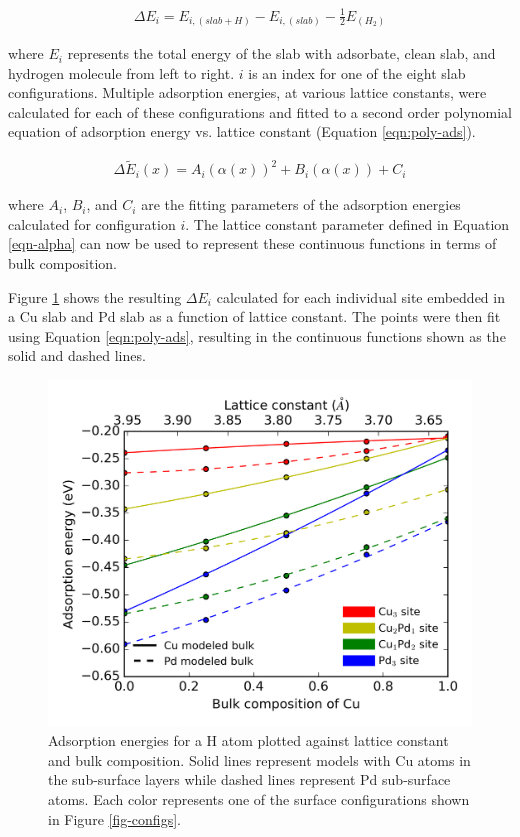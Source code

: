 \documentclass[12pt,oneside]{cmuthesis}
\begin{document}
\begin{eqnarray}
\Delta E_{i} = E_{i,(slab+H)} - E_{i,(slab)} - \frac{1}{2}E_{(H_{2})} \label{eqn-ads}
\end{eqnarray}

\noindent
where \(E_{i}\) represents the total energy of the slab with adsorbate, clean slab, and hydrogen molecule from left to right. \(i\) is an index for one of the eight slab configurations. Multiple adsorption energies, at various lattice constants, were calculated for each of these configurations and fitted to a second order polynomial equation of adsorption energy vs. lattice constant (Equation \eqref{eqn:poly-ads}).

\begin{eqnarray}
\Delta \widetilde{E}_{i}(x) = A_{i}(\alpha (x))^{2} + B_{i}(\alpha (x)) + C_{i}
\label{eqn:poly-ads}
\end{eqnarray}

\noindent
where \(A_{i}\), \(B_{i}\), and \(C_{i}\) are the fitting parameters of the adsorption energies calculated for configuration \(i\). The lattice constant parameter defined in Equation \eqref{eqn-alpha} can now be used to represent these continuous functions in terms of bulk composition.

Figure \ref{fig:ads-site} shows the resulting \(\Delta E_{i}\) calculated for each individual site embedded in a Cu slab and Pd slab as a function of lattice constant. The points were then fit using Equation \eqref{eqn:poly-ads}, resulting in the continuous functions shown as the solid and dashed lines.

\begin{figure}[h]
\centering
\includegraphics[width=5.5in]{./images/adsnrg.png}
\caption{Adsorption energies for a H atom plotted against lattice constant and bulk composition. Solid lines represent models with Cu atoms in the sub-surface layers while dashed lines represent Pd sub-surface atoms. Each color represents one of the surface configurations shown in Figure \ref{fig-configs}. \label{fig:ads-site}}
\end{figure}
\end{document}

